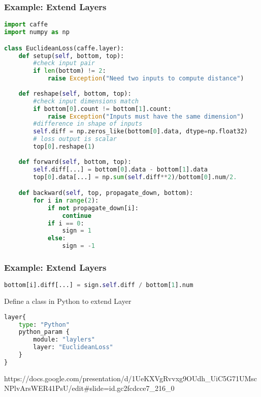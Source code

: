 
\begin{frame}[fragile]
  \MyLogo
  \frametitle{Example: Extend Layers}  
\begin{lstlisting}[language=python]
import caffe
import numpy as np 

class EuclideanLoss(caffe.layer):
	def setup(self, bottom, top):
		#check input pair
		if len(bottom) != 2:
			raise Exception("Need two inputs to compute distance")
			
	def reshape(self, bottom, top):
		#check input dimensions match
		if bottom[0].count != bottom[1].count:
			raise Exception("Inputs must have the same dimension")
		#difference in shape of inputs
		self.diff = np.zeros_like(bottom[0].data, dtype=np.float32)
		# loss output is scalar
		top[0].reshape(1)
		
	def forward(self, bottom, top):
		self.diff[...] = bottom[0].data - bottom[1].data
		top[0].data[...] = np.sum(self.diff**2)/bottom[0].num/2.	

	def backward(self, top, propagate_down, bottom):
		for i in range(2):
			if not propagate_down[i]:
				continue
			if i == 0:
				sign = 1
			else:
				sign = -1
\end{lstlisting}
\end{frame}


\begin{frame}[fragile]
  \MyLogo
  \frametitle{Example: Extend Layers}  
  
\ContinueLineNumber
\begin{lstlisting}[language=python]
			bottom[i].diff[...] = sign.self.diff / bottom[1].num
\end{lstlisting}

Define a class in Python to extend Layer
\begin{lstlisting}[language=python]
layer{
	type: "Python"
	python_param {
		module: "laylers"
		layer: "EuclideanLoss"
	}
}
\end{lstlisting}

\tiny
\begin{center}
{
\color{red}https://docs.google.com/presentation/d/1UeKXVgRvvxg9OUdh\_UiC5G71UMscNPlvArsWER41PsU/edit\#slide=id.gc2fcdcce7\_216\_0
}
\end{center}
\end{frame}